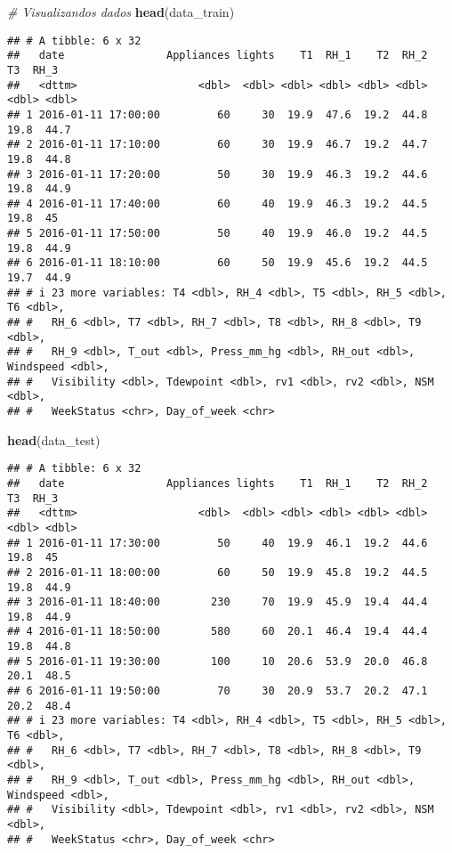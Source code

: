 \documentclass[
]{article}
\newenvironment{Shaded}{\begin{snugshade}}{\end{snugshade}}
\newcommand{\CommentTok}[1]{\textcolor[rgb]{0.56,0.35,0.01}{\textit{#1}}}
\newcommand{\FunctionTok}[1]{\textcolor[rgb]{0.13,0.29,0.53}{\textbf{#1}}}
\newcommand{\NormalTok}[1]{#1}
\begin{document}
\begin{Shaded}
\begin{Highlighting}[]
\CommentTok{\# Visualizandos dados}
\FunctionTok{head}\NormalTok{(data\_train)}
\end{Highlighting}
\end{Shaded}

\begin{verbatim}
## # A tibble: 6 x 32
##   date                Appliances lights    T1  RH_1    T2  RH_2    T3  RH_3
##   <dttm>                   <dbl>  <dbl> <dbl> <dbl> <dbl> <dbl> <dbl> <dbl>
## 1 2016-01-11 17:00:00         60     30  19.9  47.6  19.2  44.8  19.8  44.7
## 2 2016-01-11 17:10:00         60     30  19.9  46.7  19.2  44.7  19.8  44.8
## 3 2016-01-11 17:20:00         50     30  19.9  46.3  19.2  44.6  19.8  44.9
## 4 2016-01-11 17:40:00         60     40  19.9  46.3  19.2  44.5  19.8  45  
## 5 2016-01-11 17:50:00         50     40  19.9  46.0  19.2  44.5  19.8  44.9
## 6 2016-01-11 18:10:00         60     50  19.9  45.6  19.2  44.5  19.7  44.9
## # i 23 more variables: T4 <dbl>, RH_4 <dbl>, T5 <dbl>, RH_5 <dbl>, T6 <dbl>,
## #   RH_6 <dbl>, T7 <dbl>, RH_7 <dbl>, T8 <dbl>, RH_8 <dbl>, T9 <dbl>,
## #   RH_9 <dbl>, T_out <dbl>, Press_mm_hg <dbl>, RH_out <dbl>, Windspeed <dbl>,
## #   Visibility <dbl>, Tdewpoint <dbl>, rv1 <dbl>, rv2 <dbl>, NSM <dbl>,
## #   WeekStatus <chr>, Day_of_week <chr>
\end{verbatim}

\begin{Shaded}
\begin{Highlighting}[]
\FunctionTok{head}\NormalTok{(data\_test)}
\end{Highlighting}
\end{Shaded}

\begin{verbatim}
## # A tibble: 6 x 32
##   date                Appliances lights    T1  RH_1    T2  RH_2    T3  RH_3
##   <dttm>                   <dbl>  <dbl> <dbl> <dbl> <dbl> <dbl> <dbl> <dbl>
## 1 2016-01-11 17:30:00         50     40  19.9  46.1  19.2  44.6  19.8  45  
## 2 2016-01-11 18:00:00         60     50  19.9  45.8  19.2  44.5  19.8  44.9
## 3 2016-01-11 18:40:00        230     70  19.9  45.9  19.4  44.4  19.8  44.9
## 4 2016-01-11 18:50:00        580     60  20.1  46.4  19.4  44.4  19.8  44.8
## 5 2016-01-11 19:30:00        100     10  20.6  53.9  20.0  46.8  20.1  48.5
## 6 2016-01-11 19:50:00         70     30  20.9  53.7  20.2  47.1  20.2  48.4
## # i 23 more variables: T4 <dbl>, RH_4 <dbl>, T5 <dbl>, RH_5 <dbl>, T6 <dbl>,
## #   RH_6 <dbl>, T7 <dbl>, RH_7 <dbl>, T8 <dbl>, RH_8 <dbl>, T9 <dbl>,
## #   RH_9 <dbl>, T_out <dbl>, Press_mm_hg <dbl>, RH_out <dbl>, Windspeed <dbl>,
## #   Visibility <dbl>, Tdewpoint <dbl>, rv1 <dbl>, rv2 <dbl>, NSM <dbl>,
## #   WeekStatus <chr>, Day_of_week <chr>
\end{verbatim}
\end{document}
